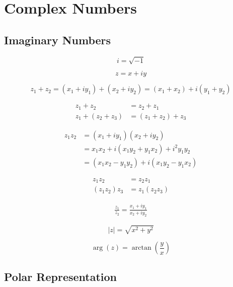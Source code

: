 \chapter{Complex Numbers}

\section{Imaginary Numbers}
\begin{equation*}
    i = \sqrt{-1}
\end{equation*}

\begin{equation*}
    z = x + iy
\end{equation*}

\begin{equation*}
    z_1 + z_2 = (x_1 + iy_1) + (x_2 + iy_2) = (x_1 + x_2) + i(y_1 + y_2)
\end{equation*}

\begin{align*}
    z_1 + z_2 &= z_2 + z_1\\
    z_1 + (z_2 + z_3) &= (z_1 + z_2) + z_3
\end{align*}

\begin{align*}
    z_1z_2 &= (x_1 + iy_1)(x_2 + iy_2)\\
    &= x_1x_2 + i(x_1y_2 + y_1x_2) + i^2 y_1y_2\\
    &= (x_1x_2 - y_1y_2) +i(x_1y_2 - y_1x_2)
\end{align*}

\begin{align*}
    z_1z_2 &= z_2z_1\\
    (z_1z_2)z_3 &= z_1(z_2z_3)
\end{align*}

\begin{align*}
    \frac{z_1}{z_2} = \frac{x_1 + iy_1}{x_2 + iy_2}
\end{align*}

\begin{equation*}
    |z| = \sqrt{x^2 + y^2}
\end{equation*}

\begin{equation*}
    \arg(z) = \arctan\left(\frac{y}{x}\right)
\end{equation*}

\section{Polar Representation}

